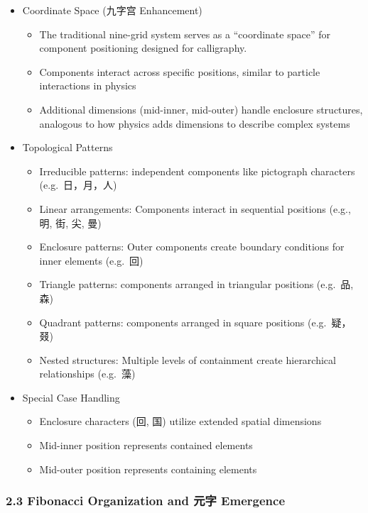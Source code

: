 \documentclass[
  11pt,
  letterpaper,
]{article}
\providecommand{\tightlist}{%
  \setlength{\itemsep}{0pt}\setlength{\parskip}{0pt}}
\begin{document}
\begin{itemize}
\tightlist
\item
  Coordinate Space (九字宫 Enhancement)

  \begin{itemize}
  \tightlist
  \item
    The traditional nine-grid system serves as a ``coordinate space''
    for component positioning designed for calligraphy.
  \item
    Components interact across specific positions, similar to particle
    interactions in physics
  \item
    Additional dimensions (mid-inner, mid-outer) handle enclosure
    structures, analogous to how physics adds dimensions to describe
    complex systems
  \end{itemize}
\item
  Topological Patterns

  \begin{itemize}
  \tightlist
  \item
    Irreducible patterns: independent components like pictograph
    characters (e.g.~日，月，人)
  \item
    Linear arrangements: Components interact in sequential positions
    (e.g., 明, 街, 尖, 曼)
  \item
    Enclosure patterns: Outer components create boundary conditions for
    inner elements (e.g.~回)
  \item
    Triangle patterns: components arranged in triangular positions
    (e.g.~品, 森)
  \item
    Quadrant patterns: components arranged in square positions
    (e.g.~疑，叕)
  \item
    Nested structures: Multiple levels of containment create
    hierarchical relationships (e.g.~藻)
  \end{itemize}
\item
  Special Case Handling

  \begin{itemize}
  \tightlist
  \item
    Enclosure characters (回, 国) utilize extended spatial dimensions
  \item
    Mid-inner position represents contained elements
  \item
    Mid-outer position represents containing elements
  \end{itemize}
\end{itemize}

\hypertarget{fibonacci-organization-and-ux5143ux5b57-emergence}{%
\subsubsection{2.3 Fibonacci Organization and 元字
Emergence}\label{fibonacci-organization-and-ux5143ux5b57-emergence}}
\end{document}
